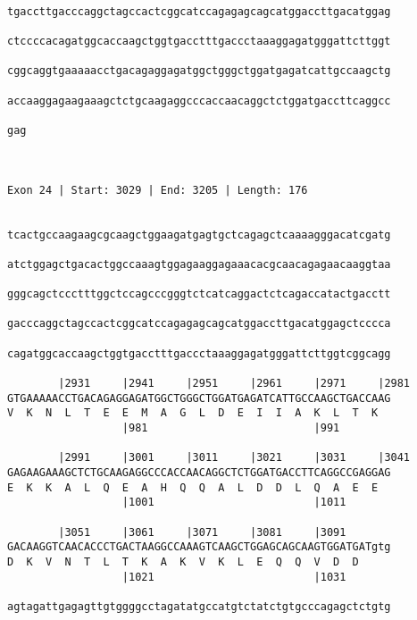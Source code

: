 \documentclass{article}
\begin{document}
\begin{Verbatim}
  
tgaccttgacccaggctagccactcggcatccagagagcagcatggaccttgacatggag
                                                            
ctccccacagatggcaccaagctggtgacctttgaccctaaaggagatgggattcttggt
                                                            
cggcaggtgaaaaacctgacagaggagatggctgggctggatgagatcattgccaagctg
                                                            
accaaggagaagaaagctctgcaagaggcccaccaacaggctctggatgaccttcaggcc
                                                            
gag
   
   
 
Exon 24 | Start: 3029 | End: 3205 | Length: 176


tcactgccaagaagcgcaagctggaagatgagtgctcagagctcaaaagggacatcgatg
                                                            
atctggagctgacactggccaaagtggagaaggagaaacacgcaacagagaacaaggtaa
                                                            
gggcagctccctttggctccagcccgggtctcatcaggactctcagaccatactgacctt
                                                            
gacccaggctagccactcggcatccagagagcagcatggaccttgacatggagctcccca
                                                            
cagatggcaccaagctggtgacctttgaccctaaaggagatgggattcttggtcggcagg
                                                            
        |2931     |2941     |2951     |2961     |2971     |2981
GTGAAAAACCTGACAGAGGAGATGGCTGGGCTGGATGAGATCATTGCCAAGCTGACCAAG
V  K  N  L  T  E  E  M  A  G  L  D  E  I  I  A  K  L  T  K  
                  |981                          |991        
  
        |2991     |3001     |3011     |3021     |3031     |3041
GAGAAGAAAGCTCTGCAAGAGGCCCACCAACAGGCTCTGGATGACCTTCAGGCCGAGGAG
E  K  K  A  L  Q  E  A  H  Q  Q  A  L  D  D  L  Q  A  E  E  
                  |1001                         |1011       
  
        |3051     |3061     |3071     |3081     |3091       
GACAAGGTCAACACCCTGACTAAGGCCAAAGTCAAGCTGGAGCAGCAAGTGGATGATgtg
D  K  V  N  T  L  T  K  A  K  V  K  L  E  Q  Q  V  D  D     
                  |1021                         |1031       
  
agtagattgagagttgtggggcctagatatgccatgtctatctgtgcccagagctctgtg
                                                            

\end{Verbatim}
\end{document}
